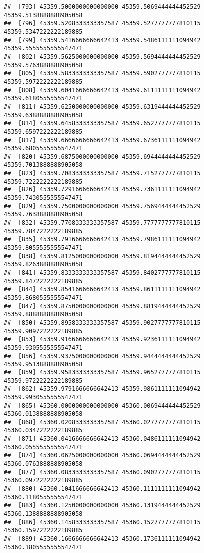 \documentclass[
]{article}
\begin{document}
\begin{verbatim}
##  [793] 45359.5000000000000000 45359.5069444444452529 45359.5138888888905058
##  [796] 45359.5208333333357587 45359.5277777777810115 45359.5347222222189885
##  [799] 45359.5416666666642413 45359.5486111111094942 45359.5555555555547471
##  [802] 45359.5625000000000000 45359.5694444444452529 45359.5763888888905058
##  [805] 45359.5833333333357587 45359.5902777777810115 45359.5972222222189885
##  [808] 45359.6041666666642413 45359.6111111111094942 45359.6180555555547471
##  [811] 45359.6250000000000000 45359.6319444444452529 45359.6388888888905058
##  [814] 45359.6458333333357587 45359.6527777777810115 45359.6597222222189885
##  [817] 45359.6666666666642413 45359.6736111111094942 45359.6805555555547471
##  [820] 45359.6875000000000000 45359.6944444444452529 45359.7013888888905058
##  [823] 45359.7083333333357587 45359.7152777777810115 45359.7222222222189885
##  [826] 45359.7291666666642413 45359.7361111111094942 45359.7430555555547471
##  [829] 45359.7500000000000000 45359.7569444444452529 45359.7638888888905058
##  [832] 45359.7708333333357587 45359.7777777777810115 45359.7847222222189885
##  [835] 45359.7916666666642413 45359.7986111111094942 45359.8055555555547471
##  [838] 45359.8125000000000000 45359.8194444444452529 45359.8263888888905058
##  [841] 45359.8333333333357587 45359.8402777777810115 45359.8472222222189885
##  [844] 45359.8541666666642413 45359.8611111111094942 45359.8680555555547471
##  [847] 45359.8750000000000000 45359.8819444444452529 45359.8888888888905058
##  [850] 45359.8958333333357587 45359.9027777777810115 45359.9097222222189885
##  [853] 45359.9166666666642413 45359.9236111111094942 45359.9305555555547471
##  [856] 45359.9375000000000000 45359.9444444444452529 45359.9513888888905058
##  [859] 45359.9583333333357587 45359.9652777777810115 45359.9722222222189885
##  [862] 45359.9791666666642413 45359.9861111111094942 45359.9930555555547471
##  [865] 45360.0000000000000000 45360.0069444444452529 45360.0138888888905058
##  [868] 45360.0208333333357587 45360.0277777777810115 45360.0347222222189885
##  [871] 45360.0416666666642413 45360.0486111111094942 45360.0555555555547471
##  [874] 45360.0625000000000000 45360.0694444444452529 45360.0763888888905058
##  [877] 45360.0833333333357587 45360.0902777777810115 45360.0972222222189885
##  [880] 45360.1041666666642413 45360.1111111111094942 45360.1180555555547471
##  [883] 45360.1250000000000000 45360.1319444444452529 45360.1388888888905058
##  [886] 45360.1458333333357587 45360.1527777777810115 45360.1597222222189885
##  [889] 45360.1666666666642413 45360.1736111111094942 45360.1805555555547471

\end{verbatim}
\end{document}
